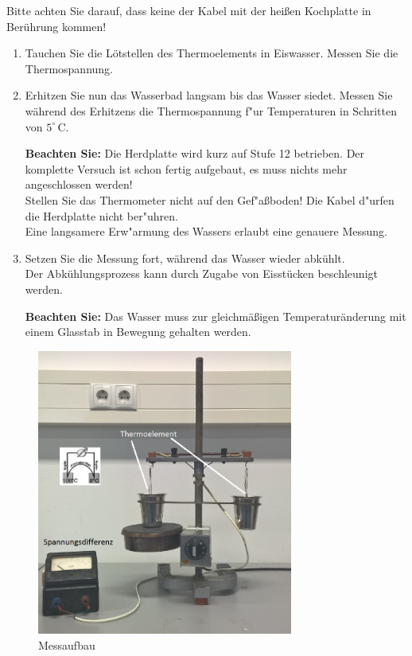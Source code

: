\begin{hint}
Bitte achten Sie darauf, dass keine der Kabel mit der heißen Kochplatte in Berührung kommen!
\end{hint}

\begin{enumerate}
 \item Tauchen Sie die Lötstellen des Thermoelements in Eiswasser. Messen Sie die Thermospannung.
 \item Erhitzen Sie nun das Wasserbad langsam bis das Wasser siedet. Messen Sie während des Erhitzens die Thermospannung f"ur Temperaturen in Schritten von $5^{\circ}$\,C.
 
 \noindent
 \textbf{Beachten Sie:} Die Herdplatte wird kurz auf Stufe 12 betrieben. Der komplette Versuch ist schon fertig aufgebaut, es muss nichts mehr angeschlossen werden!\\
 Stellen Sie das Thermometer nicht auf den Gef"a{\ss}boden! Die Kabel d"urfen die Herdplatte nicht ber"uhren.\\
 Eine langsamere Erw"armung des Wassers erlaubt eine genauere Messung.
 \item Setzen Sie die Messung fort, während das Wasser wieder abkühlt. \\
 Der Abkühlungsprozess kann durch Zugabe von Eisstücken beschleunigt werden.
 
 \noindent
 \textbf{Beachten Sie:} Das Wasser muss zur gleichmäßigen Temperaturänderung mit einem Glasstab in Bewegung gehalten werden.
\end{enumerate}
\begin{figure}[h!]
	\centering
		\includegraphics[width=0.75\textwidth]{Abbildungen/Thermoelement_Aufbau2.JPG}
	\caption{Messaufbau}
	\label{fig:Messung}
\end{figure}
